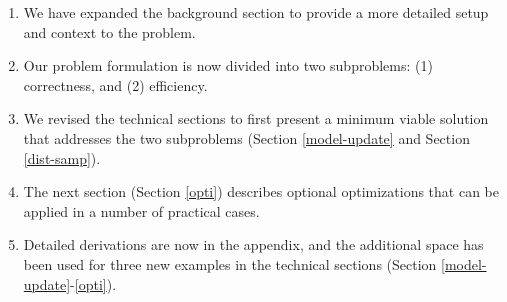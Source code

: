 \begin{enumerate}
\item We have expanded the background section to provide a more detailed setup and context to the problem.
\item Our problem formulation is now divided into two subproblems: (1) correctness, and (2) efficiency.
\item We revised the technical sections to first present a minimum viable solution that addresses the two subproblems (Section \ref{model-update} and Section  \ref{dist-samp}).
\item The next section (Section \ref{opti}) describes optional optimizations that can be applied in a number of practical cases.
\item Detailed derivations are now in the appendix, and the additional space has been used for three new examples in the technical sections (Section \ref{model-update}-\ref{opti}).
\end{enumerate}
